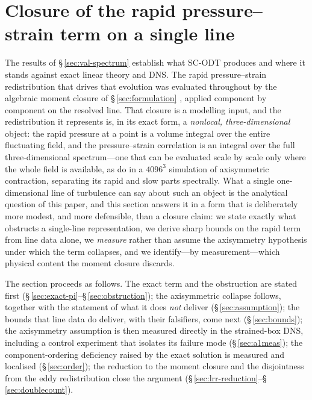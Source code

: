 \documentclass[11pt,a4paper]{article}
\newcounter{assumption}
\begin{document}
\section{Closure of the rapid pressure--strain term on a single line}\label{sec:gate}

The results of \S\,\ref{sec:val-spectrum} establish what SC-ODT
produces and where it stands against exact linear theory and DNS. The
rapid pressure--strain redistribution that drives that evolution was
evaluated throughout by the algebraic moment closure of
\S\,\ref{sec:formulation} \citep{LaunderReeceRodi1975}, applied component by
component on the resolved line. That closure is a modelling input, and the
redistribution it represents is, in its exact form, a \emph{nonlocal,
three-dimensional} object: the rapid pressure at a point is a volume
integral over the entire fluctuating field, and the pressure--strain
correlation is an integral over the full three-dimensional spectrum---one
that can be evaluated scale by scale only where the whole field is
available, as \citet{ClayYeung2016} do in a $4096^3$ simulation of
axisymmetric contraction, separating its rapid and slow parts spectrally.
What a
single one-dimensional line of turbulence can say about such an object is
the analytical question of this paper, and this section answers it in a
form that is deliberately more modest, and more defensible, than a closure
claim: we state exactly what obstructs a single-line representation, we
derive sharp bounds on the rapid term from line data alone, we
\emph{measure} rather than assume the axisymmetry hypothesis under which
the term collapses, and we identify---by measurement---which physical
content the moment closure discards.

The section proceeds as follows. The exact term and the obstruction are
stated first (\S\,\ref{sec:exact-pi}--\S\,\ref{sec:obstruction}); the
axisymmetric collapse follows, together with the statement of what it does
\emph{not} deliver (\S\,\ref{sec:assumption}); the bounds that line data do
deliver, with their falsifiers, come next (\S\,\ref{sec:bounds}); the
axisymmetry assumption is then measured directly in the strained-box DNS,
including a control experiment that isolates its failure mode
(\S\,\ref{sec:a1meas}); the component-ordering deficiency raised by the
exact solution is measured and localised (\S\,\ref{sec:order}); the
reduction to the moment closure and the disjointness from the eddy
redistribution close the argument
(\S\,\ref{sec:lrr-reduction}--\S\,\ref{sec:doublecount}).
\end{document}
